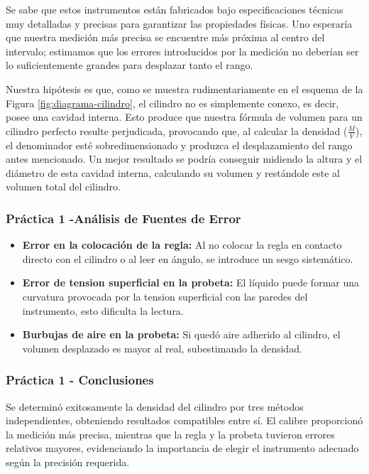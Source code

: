 Se sabe que estos instrumentos están fabricados bajo especificaciones técnicas muy detalladas y precisas para garantizar las propiedades físicas.
Uno esperaría que nuestra medición más precisa se encuentre más próxima al centro del intervalo; estimamos que los errores introducidos por la medición no deberían ser lo suficientemente grandes para desplazar tanto el rango.

Nuestra hipótesis es que, como se muestra rudimentariamente en el esquema de la Figura \ref{fig:diagrama-cilindro}, el cilindro no es simplemente conexo, es decir, posee una cavidad interna.
Esto produce que nuestra fórmula de volumen para un cilindro perfecto resulte perjudicada, provocando que, al calcular la densidad ($\frac{M}{V}$), el denominador esté sobredimensionado y produzca el desplazamiento del rango antes mencionado.
Un mejor resultado se podría conseguir midiendo la altura y el diámetro de esta cavidad interna, calculando su volumen y restándole este al volumen total del cilindro.

\subsubsection{Práctica 1 -Análisis de Fuentes de Error}

\begin{itemize}
    \item \textbf{Error en la colocación de la regla:} Al no colocar la regla en contacto directo con el cilindro o al leer en ángulo, se introduce un sesgo sistemático.
    \item \textbf{Error de tension superficial en la probeta:} El líquido puede formar una curvatura provocada por la tension superficial con las paredes del instrumento, esto dificulta la lectura.
    \item \textbf{Burbujas de aire en la probeta:} Si quedó aire adherido al cilindro, el volumen desplazado es mayor al real, subestimando la densidad.
\end{itemize}

\subsubsection{Práctica 1 - Conclusiones}

Se determinó exitosamente la densidad del cilindro por tres métodos independientes, obteniendo resultados compatibles entre sí.
El calibre proporcionó la medición más precisa, mientras que la regla y la probeta tuvieron errores relativos mayores, evidenciando la importancia de elegir el instrumento adecuado según la precisión requerida.

